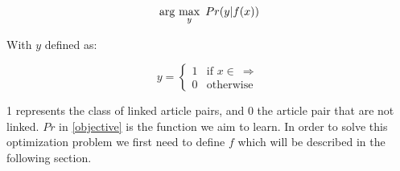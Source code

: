 \begin{equation}
\label{objective}
\arg\ \!\max_y\ Pr(y | f(x))
\end{equation}

With $y$ defined as:

\[
    y= 
\begin{cases}
    1 & \text{if } x \in \  \Rightarrow\\
    0 & \text{otherwise}
\end{cases}
\]

1 represents the class of linked article pairs, and 0 the article pair that are not linked. $Pr$ in \cref{objective} is the function we aim to learn. In order to solve this optimization problem we first need to define $f$ which will be described in the following section.

 






